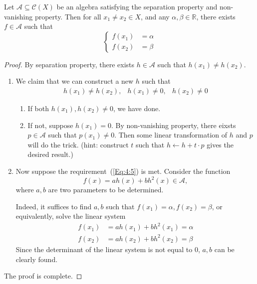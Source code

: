 \begin{proposition}\label{pro:4:13}
Let $\mathcal{A}\subseteq\mathcal{C}(X)$ be an algebra satisfying the separation property and non-vanishing property. 
Then for all $x_1\ne x_2\in X$, and any $\alpha,\beta\in\mathbb{R}$, 
there exists $f\in\mathcal{A}$ such that 
\[
\left\{
\begin{aligned}
f(x_1)&=\alpha\\
f(x_2)&=\beta
\end{aligned}
\right.
\]
\end{proposition}
\begin{proof}
By separation property, there exists $h\in\mathcal{A}$ such that 
$h(x_1)\ne h(x_2)$. 
\begin{enumerate}
\item
We claim that we can construct a new $h$ such that 
\begin{equation}\label{Eq:4:5}
\begin{array}{lll}
h(x_1)\ne h(x_2),& h(x_1)\ne0,&h(x_2)\ne0
\end{array}
\end{equation}
\begin{enumerate}
\item
If both $h(x_1),h(x_2)\ne0$, we have done.
\item
If not, suppose $h(x_1)=0$. By non-vanishing property, there eixsts $p\in\mathcal{A}$ such that $p(x_1)\ne0$. Then some linear transformation of $h$ and $p$ will do the trick. (hint: construct $t$ such that $h\leftarrow h + t\cdot p$ gives the desired result.)
\end{enumerate}
\item
Now suppose the requirement~(\ref{Eq:4:5}) is met. Consider the function 
\[
f(x)=ah(x)+bh^2(x)\in\mathcal{A},
\]
where $a,b$ are two parameters to be determined. 

Indeed, it suffices to find $a,b$ such that $f(x_1)=\alpha,f(x_2)=\beta$, or equivalently, solve the linear system
\begin{align*}
f(x_1)&=ah(x_1)+bh^2(x_1)=\alpha\\
f(x_2)&=ah(x_2)+bh^2(x_2)=\beta
\end{align*}
Since the determinant of the linear system is not equal to $0$, $a,b$ can be clearly found.
\end{enumerate}
The proof is complete.
\end{proof}

